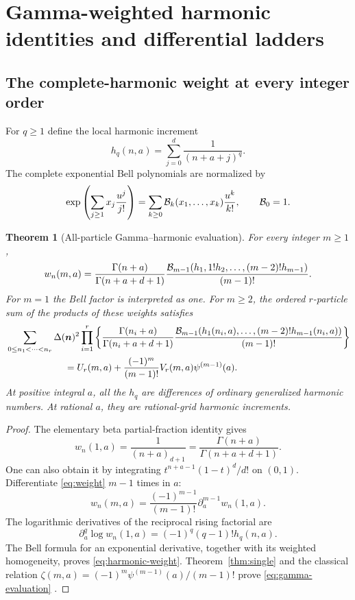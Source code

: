 \documentclass[11pt,letterpaper]{article}
\numberwithin{equation}{section}
\newtheorem{theorem}{Theorem}[section]
\theoremstyle{definition}\newtheorem{definition}[theorem]{Definition}
\theoremstyle{remark}\newtheorem{remark}[theorem]{Remark}
\begin{document}
\section{Gamma-weighted harmonic identities and differential ladders}
\label{sec:gamma}

\subsection{The complete-harmonic weight at every integer order}
For $q\ge1$ define the local harmonic increment
\begin{equation}\label{eq:local-harmonic}
 h_q(n,a)=\sum_{j=0}^d\frac1{(n+a+j)^q}.
\end{equation}
The complete exponential Bell polynomials are normalized by
\begin{equation}\label{eq:bell}
 \exp\left(\sum_{j\ge1}x_j\frac{u^j}{j!}\right)
 =\sum_{k\ge0}\mathcal B_k(x_1,\ldots,x_k)\frac{u^k}{k!},
 \qquad \mathcal B_0=1.
\end{equation}

\begin{theorem}[All-particle Gamma--harmonic evaluation]\label{thm:gamma}
For every integer $m\ge1$,
\begin{equation}\label{eq:harmonic-weight}
 w_n(m,a)=\frac{\Gamma(n+a)}{\Gamma(n+a+d+1)}
 \frac{\mathcal B_{m-1}(h_1,1!h_2,\ldots,(m-2)!h_{m-1})}{(m-1)!}.
\end{equation}
For $m=1$ the Bell factor is interpreted as one. For $m\ge2$, the
ordered $r$-particle sum of the products of these weights satisfies
\begin{align}
 &\sum_{0\le n_1<\cdots<n_r}\Delta(\bm n)^2
 \prod_{i=1}^r
 \left\{\frac{\Gamma(n_i+a)}{\Gamma(n_i+a+d+1)}
 \frac{\Bell_{m-1}(h_1(n_i,a),\ldots,(m-2)!h_{m-1}(n_i,a))}
 {(m-1)!}\right\}\notag\\
 &\hspace{22mm}=U_r(m,a)+
        \frac{(-1)^m}{(m-1)!}V_r(m,a)\psi^{(m-1)}(a).
 \label{eq:gamma-evaluation}
\end{align}
At positive integral $a$, all the $h_q$ are differences of ordinary
generalized harmonic numbers. At rational $a$, they are rational-grid
harmonic increments.
\end{theorem}
\begin{proof}
The elementary beta partial-fraction identity gives
\[
 w_n(1,a)=\frac1{(n+a)_{d+1}}
        =\frac{\Gamma(n+a)}{\Gamma(n+a+d+1)}.
\]
One can also obtain it by integrating
$t^{n+a-1}(1-t)^d/d!$ on $(0,1)$.
Differentiate \eqref{eq:weight} $m-1$ times in $a$:
\begin{equation}\label{eq:weight-derivative-integer}
 w_n(m,a)=\frac{(-1)^{m-1}}{(m-1)!}
          \partial_a^{m-1}w_n(1,a).
\end{equation}
The logarithmic derivatives of the reciprocal rising factorial are
\[
 \partial_a^q\log w_n(1,a)
     =(-1)^q(q-1)!h_q(n,a).
\]
The Bell formula for an exponential derivative, together with its weighted
homogeneity, proves \eqref{eq:harmonic-weight}. Theorem~\ref{thm:single}
and the classical relation
$\zeta(m,a)=(-1)^m\psi^{(m-1)}(a)/(m-1)!$ prove
\eqref{eq:gamma-evaluation} \cite{dlmf:hurwitz}.
\end{proof}
\end{document}

